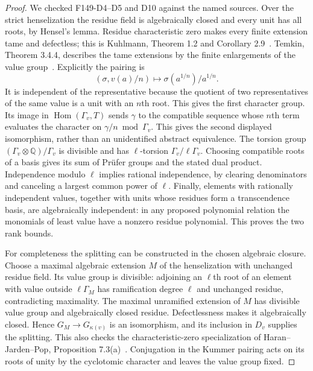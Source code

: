 \begin{proof}
We checked F149-D4--D5 and D10 against the named sources.
Over the strict henselization the residue field is algebraically
closed and every unit has all roots, by Hensel's lemma. Residue
characteristic zero makes every finite extension tame and
defectless; this is Kuhlmann, Theorem 1.2 and Corollary
2.9~\cite{F-KuhlmannTame}. Temkin, Theorem 3.4.4, describes
the tame extensions by the finite enlargements of the value
group~\cite{F-Temkin}. Explicitly the pairing is
\[
 (\sigma,v(a)/n)\longmapsto \sigma(a^{1/n})/a^{1/n}.
\]
It is independent of the representative because the quotient
of two representatives of the same value is a unit with an
$n$th root. This gives the first character group. Its image in
$\operatorname{Hom}(\Gamma_v,T)$ sends $\gamma$ to the
compatible sequence whose $n$th term evaluates the character
on $\gamma/n\bmod\Gamma_v$. This gives the second displayed
isomorphism, rather than an unidentified abstract equivalence.
The torsion group $(\Gamma_v\otimes\mathbb Q)/\Gamma_v$ is
divisible and has $\ell$-torsion $\Gamma_v/\ell\Gamma_v$.
Choosing compatible roots of a basis gives its sum of Pr\"ufer
groups and the stated dual product. Independence modulo $\ell$
implies rational independence, by clearing denominators and
canceling a largest common power of $\ell$. Finally, elements
with rationally independent values, together with units whose
residues form a transcendence basis, are algebraically
independent: in any proposed polynomial relation the monomials
of least value have a nonzero residue polynomial. This proves
the two rank bounds.

For completeness the splitting can be constructed in the chosen
algebraic closure. Choose a maximal algebraic extension $M$ of
the henselization with unchanged residue field. Its value group
is divisible: adjoining an $\ell$th root of an element with value
outside $\ell\Gamma_M$ has ramification degree $\ell$ and
unchanged residue, contradicting maximality. The maximal
unramified extension of $M$ has divisible value group and
algebraically closed residue. Defectlessness makes it algebraically
closed. Hence $G_M\to G_{\kappa(v)}$ is an isomorphism, and
its inclusion in $D_v$ supplies the splitting. This also checks
the characteristic-zero specialization of Haran--Jarden--Pop,
Proposition 7.3(a)~\cite{F-HaranJardenPop}. Conjugation in the
Kummer pairing acts on its roots of unity by the cyclotomic
character and leaves the value group fixed.


\end{proof}
